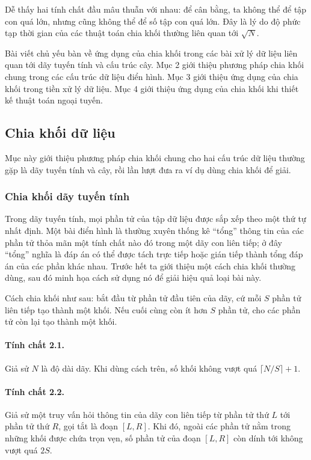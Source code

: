 \documentclass[11pt]{article}
\begin{document}
Dễ thấy hai tính chất đầu mâu thuẫn với nhau: để cân bằng, ta không thể để
tập con quá lớn, nhưng cũng không thể để số tập con quá lớn. Đây là lý do độ
phức tạp thời gian của các thuật toán chia khối thường liên quan tới
\(\sqrt N\).

Bài viết chủ yếu bàn về ứng dụng của chia khối trong các bài xử lý dữ liệu
liên quan tới dãy tuyến tính và cấu trúc cây. Mục 2 giới thiệu phương pháp
chia khối chung trong các cấu trúc dữ liệu điển hình. Mục 3 giới thiệu ứng
dụng của chia khối trong tiền xử lý dữ liệu. Mục 4 giới thiệu ứng dụng của
chia khối khi thiết kế thuật toán ngoại tuyến.

\subsection{Chia khối dữ liệu}

Mục này giới thiệu phương pháp chia khối chung cho hai cấu trúc dữ liệu
thường gặp là dãy tuyến tính và cây, rồi lần lượt đưa ra ví dụ dùng chia khối
để giải.

\subsubsection{Chia khối dãy tuyến tính}

Trong dãy tuyến tính, mọi phần tử của tập dữ liệu được sắp xếp theo một thứ
tự nhất định. Một bài điển hình là thường xuyên thống kê ``tổng'' thông tin
của các phần tử thỏa mãn một tính chất nào đó trong một dãy con liên tiếp; ở
đây ``tổng'' nghĩa là đáp án có thể được tách trực tiếp hoặc gián tiếp thành
tổng đáp án của các phần khác nhau. Trước hết ta giới thiệu một cách chia
khối thường dùng, sau đó minh họa cách sử dụng nó để giải hiệu quả loại bài
này.

Cách chia khối như sau: bắt đầu từ phần tử đầu tiên của dãy, cứ mỗi \(S\)
phần tử liên tiếp tạo thành một khối. Nếu cuối cùng còn ít hơn \(S\) phần tử,
cho các phần tử còn lại tạo thành một khối.

\paragraph{Tính chất 2.1.}
Giả sử \(N\) là độ dài dãy. Khi dùng cách trên, số khối không vượt quá
\(\lceil N/S\rceil+1\).

\paragraph{Tính chất 2.2.}
Giả sử một truy vấn hỏi thông tin của dãy con liên tiếp từ phần tử thứ \(L\)
tới phần tử thứ \(R\), gọi tắt là đoạn \([L,R]\). Khi đó, ngoài các phần tử
nằm trong những khối được chứa trọn vẹn, số phần tử của đoạn \([L,R]\) còn
dính tới không vượt quá \(2S\).
\end{document}
